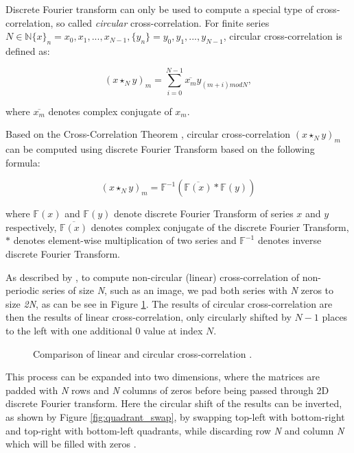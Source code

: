 Discrete Fourier transform can only be used to compute a special type of cross-correlation, so called \textit{circular} cross-correlation.
For finite series $N \in \mathbb{N} \{x\}_n = x_0, x_1, ..., x_{N-1}, \{y_n\} = y_0, y_1, ..., y_{N-1}$, circular cross-correlation is defined as:

\[
(x \star_N y)_m = \sum_{i=0}^{N-1} \overline{x_m} y_{(m + i) mod N},
\]

where $\overline{x_m}$ denotes complex conjugate of $x_m$.


Based on the Cross-Correlation Theorem \citep{thesis:wang}, circular cross-correlation $(x \star_N y)_m$ can be computed using discrete Fourier Transform based on the following formula:

\[
(x \star_N y)_m = \mathbb{F}^{-1}(\overline{\mathbb{F}(x)}*\mathbb{F}(y))
\]

where $\mathbb{F}(x)$ and $\mathbb{F}(y)$ denote discrete Fourier Transform of series $x$ and $y$ respectively, $\overline{\mathbb{F}(x)}$ denotes complex conjugate of the discrete Fourier Transform, $*$ denotes element-wise multiplication of two series and $\mathbb{F}^{-1}$ denotes inverse discrete Fourier Transform.

As described by \citet{misko}, to compute non-circular (linear) cross-correlation of non-periodic series of size \textit{N}, such as an image, we pad both series with \textit{N} zeros to size \textit{2N}, as can be see in Figure \ref{fig:circular_cross_corr}. The results of circular cross-correlation are then the results of linear cross-correlation, only circularly shifted by $N-1$ places to the left with one additional 0 value at index $N$. 

\begin{figure}[h]
	\centering
	\def\svgwidth{0.8\textwidth}
	
	\caption{Comparison of linear and circular cross-correlation \citep{misko}.}
	\label{fig:circular_cross_corr}
\end{figure}


This process can be expanded into two dimensions, where the matrices are padded with \textit{N} rows and \textit{N} columns of zeros before being passed through 2D discrete Fourier transform. Here the circular shift of the results can be inverted, as shown by Figure \ref{fig:quadrant_swap}, by swapping top-left with bottom-right and top-right with bottom-left quadrants, while discarding row \textit{N} and column \textit{N} which will be filled with zeros \citep{misko}. 

